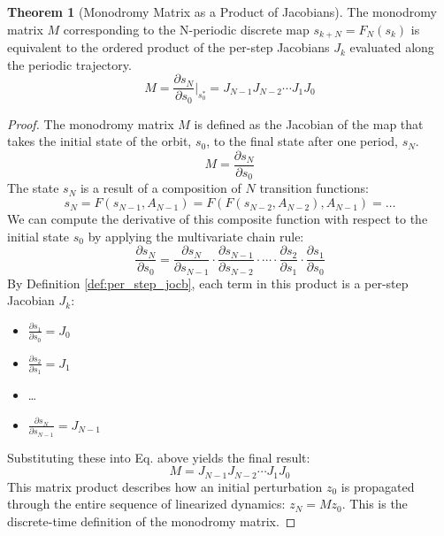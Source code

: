\documentclass{article}
\theoremstyle{remark}
\theoremstyle{definition}
\newtheorem{theorem}{Theorem}[section]
\begin{document}
\begin{theorem}[Monodromy Matrix as a Product of Jacobians]
The monodromy matrix $M$ corresponding to the N-periodic discrete map $s_{k+N} = F_N(s_k)$ is equivalent to the ordered product of the per-step Jacobians $J_k$ evaluated along the periodic trajectory.
\begin{equation}
    M = \frac{\partial s_N}{\partial s_0} \bigg|_{s^*_0} = J_{N-1} J_{N-2} \cdots J_1 J_0
\end{equation}
\end{theorem}

\begin{proof}
The monodromy matrix $M$ is defined as the Jacobian of the map that takes the initial state of the orbit, $s_0$, to the final state after one period, $s_N$.
\begin{equation}
    M = \frac{\partial s_N}{\partial s_0}
\end{equation}
The state $s_N$ is a result of a composition of $N$ transition functions:
\begin{equation}
    s_N = F(s_{N-1}, A_{N-1}) = F(F(s_{N-2}, A_{N-2}), A_{N-1}) = \dots
\end{equation}
We can compute the derivative of this composite function with respect to the initial state $s_0$ by applying the multivariate chain rule:
\begin{equation}
    \frac{\partial s_N}{\partial s_0} = \frac{\partial s_N}{\partial s_{N-1}} \cdot \frac{\partial s_{N-1}}{\partial s_{N-2}} \cdot \cdots \cdot \frac{\partial s_2}{\partial s_1} \cdot \frac{\partial s_1}{\partial s_0}
\end{equation}
By Definition \ref{def:per_step_jocb}, each term in this product is a per-step Jacobian $J_k$:
\begin{itemize}
    \item $\frac{\partial s_1}{\partial s_0} = J_0$
    \item $\frac{\partial s_2}{\partial s_1} = J_1$
    \item \dots
    \item $\frac{\partial s_N}{\partial s_{N-1}} = J_{N-1}$
\end{itemize}
Substituting these into Eq. above yields the final result:
\begin{equation}
    M = J_{N-1} J_{N-2} \cdots J_1 J_0
\end{equation}
This matrix product describes how an initial perturbation $z_0$ is propagated through the entire sequence of linearized dynamics: $z_N = M z_0$. This is the discrete-time definition of the monodromy matrix.
\end{proof}
\end{document}
